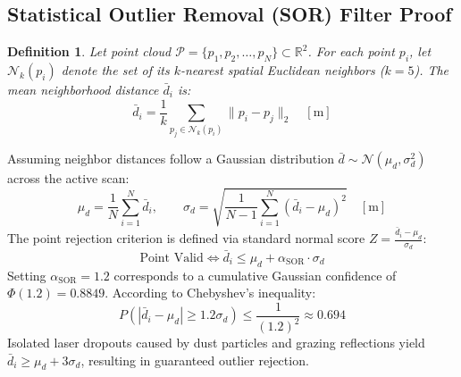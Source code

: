 \documentclass[11pt, a4paper]{article}
\newtheorem{definition}{Definition}[section]
\begin{document}
\subsection{Statistical Outlier Removal (SOR) Filter Proof}
\begin{definition}
Let point cloud $\mathcal{P} = \{p_1, p_2, \dots, p_N\} \subset \mathbb{R}^2$. For each point $p_i$, let $\mathcal{N}_k(p_i)$ denote the set of its $k$-nearest spatial Euclidean neighbors ($k = 5$). The mean neighborhood distance $\bar{d}_i$ is:
\begin{equation}
    \bar{d}_i = \frac{1}{k}\sum_{p_j \in \mathcal{N}_k(p_i)} \| p_i - p_j \|_2 \quad [\text{m}]
\end{equation}
\end{definition}

Assuming neighbor distances follow a Gaussian distribution $\bar{d} \sim \mathcal{N}(\mu_d, \sigma_d^2)$ across the active scan:
\begin{equation}
    \mu_d = \frac{1}{N}\sum_{i=1}^N \bar{d}_i, \qquad \sigma_d = \sqrt{\frac{1}{N-1}\sum_{i=1}^N (\bar{d}_i - \mu_d)^2} \quad [\text{m}]
\end{equation}
The point rejection criterion is defined via standard normal score $Z = \frac{\bar{d}_i - \mu_d}{\sigma_d}$:
\begin{equation}
    \text{Point Valid} \iff \bar{d}_i \le \mu_d + \alpha_{\text{SOR}} \cdot \sigma_d
\end{equation}
Setting $\alpha_{\text{SOR}} = 1.2$ corresponds to a cumulative Gaussian confidence of $\Phi(1.2) = 0.8849$. According to Chebyshev's inequality:
\begin{equation}
    P(|\bar{d}_i - \mu_d| \ge 1.2\sigma_d) \le \frac{1}{(1.2)^2} \approx 0.694
\end{equation}
Isolated laser dropouts caused by dust particles and grazing reflections yield $\bar{d}_i \ge \mu_d + 3\sigma_d$, resulting in guaranteed outlier rejection.
\end{document}
